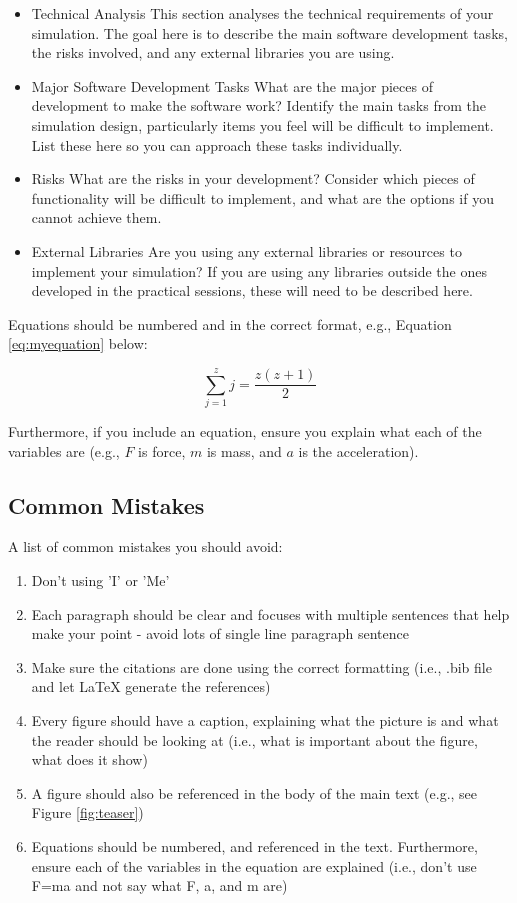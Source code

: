 \documentclass[conference,backref=page]{acmsiggraph}
\begin{document}
\begin{itemize}
\item {Technical Analysis} This section analyses the technical requirements of your simulation.  The goal here is to describe the main software development tasks, the risks involved, and any external libraries you are using.
\item {Major Software Development Tasks} What are the major pieces of development to make the software work?  Identify the main tasks from the simulation design, particularly items you feel will be difficult to implement.  List these here so you can approach these tasks individually.
\item {Risks} What are the risks in your development?  Consider which pieces of functionality will be difficult to implement, and what are the options if you cannot achieve them.
\item {External Libraries} Are you using any external libraries or resources to implement your simulation?  If you are using any libraries outside the ones developed in the practical sessions, these will need to be described here.
\end{itemize}


Equations should be numbered and in the correct format, e.g., Equation \ref{eq:myequation} below:

\begin{equation} \label{eq:myequation}
 \sum_{j=1}^{z} j = \frac{z(z+1)}{2}
\end{equation}

Furthermore, if you include an equation, ensure you explain what each of the variables are (e.g., $F$ is force, $m$ is mass, and $a$ is the acceleration).

\subsection{Common Mistakes}
A list of common mistakes you should avoid:
\begin{enumerate}
\item Don't using 'I' or 'Me'
\item Each paragraph should be clear and focuses with multiple sentences that help make your point - avoid lots of single line paragraph sentence
\item Make sure the citations are done using the correct formatting (i.e., .bib file and let LaTeX generate the references)
\item Every figure should have a caption, explaining what the picture is and what the reader should be looking at (i.e., what is important about the figure, what does it show)
\item A figure should also be referenced in the body of the main text (e.g., see Figure \ref{fig:teaser})
\item Equations should be numbered, and referenced in the text. Furthermore, ensure each of the variables in the equation are explained (i.e., don't use F=ma and not say what F, a, and m are)
\end{enumerate}
\end{document}
